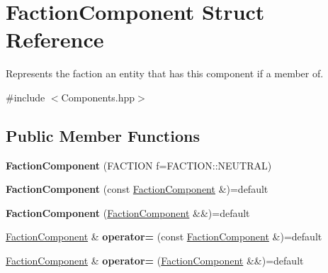 \hypertarget{struct_faction_component}{}\section{Faction\+Component Struct Reference}
\label{struct_faction_component}


Represents the faction an entity that has this component if a member of.  




{\ttfamily \#include $<$Components.\+hpp$>$}

\subsection*{Public Member Functions}
\begin{DoxyCompactItemize}
\item 
{\bfseries Faction\+Component} (F\+A\+C\+T\+I\+ON f=F\+A\+C\+T\+I\+O\+N\+::\+N\+E\+U\+T\+R\+AL)\hypertarget{struct_faction_component_ada93ef76a2110fb92cbf2d2971cad139}{}\label{struct_faction_component_ada93ef76a2110fb92cbf2d2971cad139}

\item 
{\bfseries Faction\+Component} (const \hyperlink{struct_faction_component}{Faction\+Component} \&)=default\hypertarget{struct_faction_component_a0416d9a5435c81dc2df095b145dd49f4}{}\label{struct_faction_component_a0416d9a5435c81dc2df095b145dd49f4}

\item 
{\bfseries Faction\+Component} (\hyperlink{struct_faction_component}{Faction\+Component} \&\&)=default\hypertarget{struct_faction_component_a5307de75b0571b6f6d2bf1f71399f111}{}\label{struct_faction_component_a5307de75b0571b6f6d2bf1f71399f111}

\item 
\hyperlink{struct_faction_component}{Faction\+Component} \& {\bfseries operator=} (const \hyperlink{struct_faction_component}{Faction\+Component} \&)=default\hypertarget{struct_faction_component_a5aa9e9593b87e724bcf93381a825a39c}{}\label{struct_faction_component_a5aa9e9593b87e724bcf93381a825a39c}

\item 
\hyperlink{struct_faction_component}{Faction\+Component} \& {\bfseries operator=} (\hyperlink{struct_faction_component}{Faction\+Component} \&\&)=default\hypertarget{struct_faction_component_aa707ae4a3f7c95140d21e290649152bd}{}\label{struct_faction_component_aa707ae4a3f7c95140d21e290649152bd}

\end{DoxyCompactItemize}
